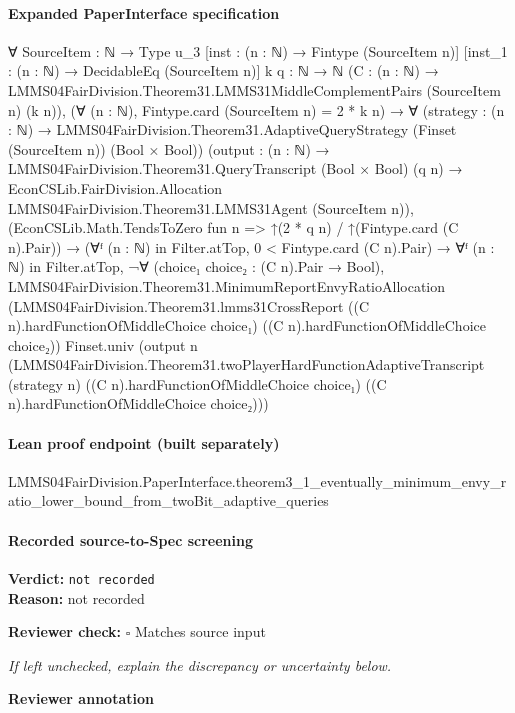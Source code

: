 \documentclass[10pt]{article}
\newcommand{\reviewerbox}{%
  \par\noindent\fbox{\parbox{0.96\linewidth}{\rule{0pt}{0.38in}}}\par
}
\newcommand{\reviewmatch}[1]{%
  \par\noindent\textbf{Reviewer check:} $\square$\; #1\par
  \noindent\emph{If left unchecked, explain the discrepancy or uncertainty below.}\par
}
\begin{document}
\paragraph{Expanded PaperInterface specification}
\begin{ReviewVerbatim}
∀ {SourceItem : ℕ → Type u_3} [inst : (n : ℕ) → Fintype (SourceItem n)] [inst_1 : (n : ℕ) → DecidableEq (SourceItem n)]
  {k q : ℕ → ℕ} (C : (n : ℕ) → LMMS04FairDivision.Theorem31.LMMS31MiddleComplementPairs (SourceItem n) (k n)),
  (∀ (n : ℕ), Fintype.card (SourceItem n) = 2 * k n) →
    ∀ (strategy : (n : ℕ) → LMMS04FairDivision.Theorem31.AdaptiveQueryStrategy (Finset (SourceItem n)) (Bool × Bool))
      (output :
        (n : ℕ) →
          LMMS04FairDivision.Theorem31.QueryTranscript (Bool × Bool) (q n) →
            EconCSLib.FairDivision.Allocation LMMS04FairDivision.Theorem31.LMMS31Agent (SourceItem n)),
      (EconCSLib.Math.TendsToZero fun n => ↑(2 * q n) / ↑(Fintype.card (C n).Pair)) →
        (∀ᶠ (n : ℕ) in Filter.atTop, 0 < Fintype.card (C n).Pair) →
          ∀ᶠ (n : ℕ) in Filter.atTop,
            ¬∀ (choice₁ choice₂ : (C n).Pair → Bool),
                LMMS04FairDivision.Theorem31.MinimumReportEnvyRatioAllocation
                  (LMMS04FairDivision.Theorem31.lmms31CrossReport ((C n).hardFunctionOfMiddleChoice choice₁)
                    ((C n).hardFunctionOfMiddleChoice choice₂))
                  Finset.univ
                  (output n
                    (LMMS04FairDivision.Theorem31.twoPlayerHardFunctionAdaptiveTranscript (strategy n)
                      ((C n).hardFunctionOfMiddleChoice choice₁) ((C n).hardFunctionOfMiddleChoice choice₂)))
\end{ReviewVerbatim}

\paragraph{Lean proof endpoint (built separately)}\begin{ReviewVerbatim}
LMMS04FairDivision.PaperInterface.theorem3_1_eventually_minimum_envy_ratio_lower_bound_from_twoBit_adaptive_queries
\end{ReviewVerbatim}

\paragraph{Recorded source-to-Spec screening}
\textbf{Verdict:} \texttt{not recorded}
\\
\textbf{Reason:} not recorded
\reviewmatch{Matches source input}
\noindent\textbf{Reviewer annotation}\par
\reviewerbox
\clearpage
\hypertarget{source-claim-c0ef61df051381e6}{}
\end{document}
